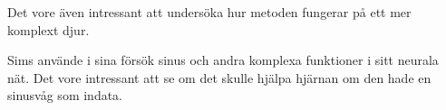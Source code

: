 \documentclass[titlepage, twocolumn, a4paper, 11pt, swedish]{article}
\begin{document}
Det vore även intressant att undersöka hur metoden fungerar på ett mer komplext djur. 

Sims använde i sina försök sinus och andra komplexa funktioner i sitt neurala nät. Det vore intressant att se om det skulle hjälpa hjärnan om den hade en sinusvåg som indata.








\onecolumn
\newpage
\appendix
{}

\end{document}
